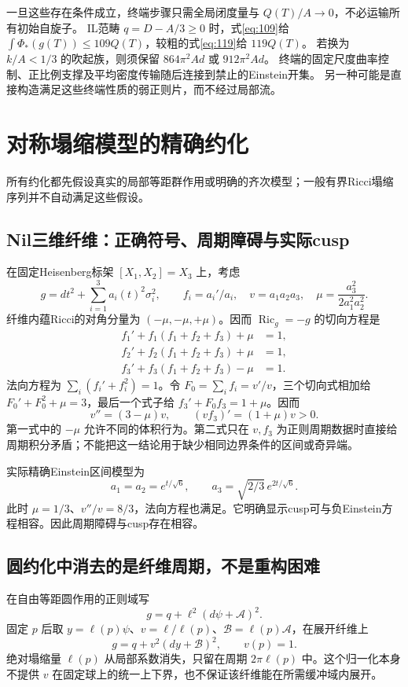 \documentclass[UTF8,a4paper,11pt,fontset=fandol]{ctexart}
\numberwithin{equation}{section}
\theoremstyle{definition}
\newcommand{\Ric}{\operatorname{Ric}}
\begin{document}
一旦这些存在条件成立，终端步骤只需全局闭度量与
$Q(T)/A\to0$，不必运输所有初始自旋子。
IL范畴 $q=D-A/3\ge0$ 时，式\eqref{eq:109}给
$\int\Phi_*(g(T))\le109Q(T)$，较粗的式\eqref{eq:119}给 $119Q(T)$。
若换为 $k/A<1/3$ 的吹起族，则须保留 $864\pi^2Ad$ 或 $912\pi^2Ad$。
终端的固定尺度曲率控制、正比例支撑及平均密度传输随后连接到禁止的Einstein开集。
另一种可能是直接构造满足这些终端性质的弱正则片，而不经过局部流。

\section{对称塌缩模型的精确约化}\label{app:reduction}
所有约化都先假设真实的局部等距群作用或明确的齐次模型；一般有界Ricci塌缩序列并不自动满足这些假设。

\subsection{Nil三维纤维：正确符号、周期障碍与实际cusp}
在固定Heisenberg标架 $[X_1,X_2]=X_3$ 上，考虑
\[
g=dt^2+\sum_{i=1}^3 a_i(t)^2\sigma_i^2,\qquad
f_i=a_i'/a_i,\quad v=a_1a_2a_3,\quad
\mu=\frac{a_3^2}{2a_1^2a_2^2}.
\]
纤维内蕴Ricci的对角分量为 $(-\mu,-\mu,+\mu)$。因而 $\Ric_g=-g$ 的切向方程是
\begin{align*}
f_1'+f_1(f_1+f_2+f_3)+\mu&=1,\\
f_2'+f_2(f_1+f_2+f_3)+\mu&=1,\\
f_3'+f_3(f_1+f_2+f_3)-\mu&=1.
\end{align*}
法向方程为 $\sum_i(f_i'+f_i^2)=1$。令 $F_0=\sum_i f_i=v'/v$，三个切向式相加给 $F_0'+F_0^2+\mu=3$，最后一个式子给 $f_3'+F_0f_3=1+\mu$。因而
\[
\boxed{v''=(3-\mu)v,}\qquad
\boxed{(vf_3)'=(1+\mu)v>0.}
\]
第一式中的 $-\mu$ 允许不同的体积行为。第二式只在 $v,f_3$ 为正则周期数据时直接给周期积分矛盾；不能把这一结论用于缺少相同边界条件的区间或奇异端。

实际精确Einstein区间模型为
\[
a_1=a_2=e^{t/\sqrt6},\qquad
a_3=\sqrt{2/3}\,e^{2t/\sqrt6}.
\]
此时 $\mu=1/3$、$v''/v=8/3$，法向方程也满足。它明确显示cusp可与负Einstein方程相容。因此周期障碍与cusp存在相容。

\subsection{圆约化中消去的是纤维周期，不是重构困难}
在自由等距圆作用的正则域写
\[
g=q+\ell^2(d\psi+\mathcal A)^2.
\]
固定 $p$ 后取 $y=\ell(p)\psi$、$v=\ell/\ell(p)$、$\mathcal B=\ell(p)\mathcal A$，在展开纤维上
\[
g=q+v^2(dy+\mathcal B)^2,\qquad v(p)=1.
\]
绝对塌缩量 $\ell(p)$ 从局部系数消失，只留在周期 $2\pi\ell(p)$ 中。这个归一化本身不提供 $v$ 在固定球上的统一上下界，也不保证该纤维能在所需缓冲域内展开。
\end{document}
